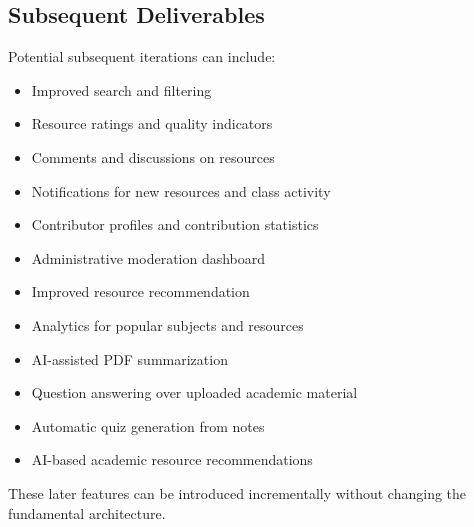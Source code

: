 \documentclass[11pt,a4paper]{article}
\begin{document}
\subsection{Subsequent Deliverables}
Potential subsequent iterations can include:
\begin{itemize}[leftmargin=*]
    \item Improved search and filtering
    \item Resource ratings and quality indicators
    \item Comments and discussions on resources
    \item Notifications for new resources and class activity
    \item Contributor profiles and contribution statistics
    \item Administrative moderation dashboard
    \item Improved resource recommendation
    \item Analytics for popular subjects and resources
    \item AI-assisted PDF summarization
    \item Question answering over uploaded academic material
    \item Automatic quiz generation from notes
    \item AI-based academic resource recommendations
\end{itemize}

These later features can be introduced incrementally without changing the fundamental architecture.
\end{document}
